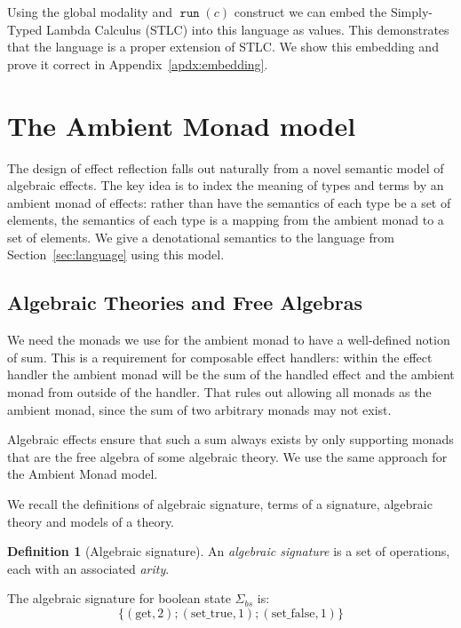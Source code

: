 \documentclass[acmsmall, screen, review, anonymous]{acmart}
\theoremstyle{definition}
\newtheorem{definition}{Definition}[section]
\newcommand{\grunname}{\mathtt{run}}
\newcommand{\grun}[1]{\mathop{\grunname}(#1)}
\begin{document}
Using the global modality and $\grun{c}$ construct we can embed the
Simply-Typed Lambda Calculus (STLC) into this language as values. This
demonstrates that the language is a proper extension of STLC. We show this
embedding and prove it correct in Appendix~\ref{apdx:embedding}.

\section{The Ambient Monad model}
\label{sec:semantics}

The design of effect reflection falls out naturally from a novel
semantic model of algebraic effects. The key idea is to index the
meaning of types and terms by an ambient monad of effects: rather than
have the semantics of each type be a set of elements, the semantics of
each type is a mapping from the ambient monad to a set of elements. We
give a denotational semantics to the language from
Section~\ref{sec:language} using this model.

\subsection{Algebraic Theories and Free Algebras}

We need the monads we use for the ambient monad to have a well-defined
notion of sum. This is a requirement for composable effect handlers:
within the effect handler the ambient monad will be the sum of the
handled effect and the ambient monad from outside of the handler. That
rules out allowing all monads as the ambient monad, since the sum of two
arbitrary monads may not exist.

Algebraic effects ensure that such a sum always exists by only
supporting monads that are the free algebra of some algebraic theory. We
use the same approach for the Ambient Monad model.

We recall the definitions of algebraic signature, terms of a signature,
algebraic theory and models of a theory.
\begin{definition}[Algebraic signature]
  An \emph{algebraic signature} is a set of operations, each with an
  associated \emph{arity}.
\end{definition}

\begin{example}
  The algebraic signature for boolean state $\Sigma_{bs}$ is:
  \begin{equation*}
    \{ (\mathrm{get}, 2); (\mathrm{set\_true}, 1); (\mathrm{set\_false}, 1) \}
  \end{equation*}
\end{example}
\end{document}
